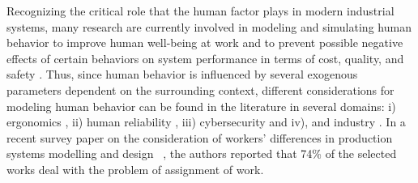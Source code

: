 \documentclass[review,12pt, 3p, times]{elsarticle}
\begin{document}
Recognizing the critical role that the human factor plays in modern industrial systems, many research are currently involved in modeling and simulating human behavior to improve human well-being at work and to prevent possible negative effects of certain behaviors on system performance in terms of cost, quality, and safety \citep{Jahanmahin2022}.
Thus, since human behavior is influenced by several exogenous parameters dependent on the surrounding context, different considerations for modeling human behavior can be found in the literature in several domains:  i) ergonomics \citep{ferjani2015,ferjani2017, Berlin2017, Greig2019}, ii) human reliability \citep{Azarkhil2014,DiPasquale2013,Dantan2020}, iii) cybersecurity \citep{Upadhyay2022,SanchezAguayo2021,Domarkiene2021,Moallem2021} and iv), and industry \citep{Schia2019,Kong2020,Mossa2015}. In a recent survey paper on the consideration of workers’ differences in production systems modelling and design ~\cite{Katiraee2021a}, the authors reported that 74\% of the selected works deal with the problem of assignment of work. 
\end{document}
